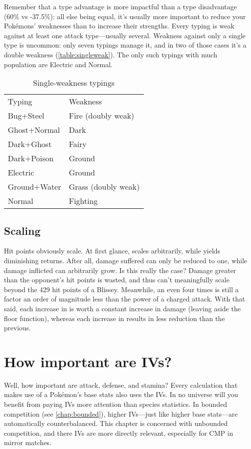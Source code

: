 Remember that a type advantage is more impactful than a type
  disadvantage (60\% vs -37.5\%):
  all else being equal, it's usually more important to reduce your Pokémons'
  weaknesses than to increase their strengths.
Every typing is weak against at least one attack type---usually several.
Weakness against only a single type is uncommon: only seven typings manage it, and in two
 of those cases it's a double weakness (\autoref{table:singleweak}).
The only such typings with much population are Electric and Normal. 
\begin{table}[ht]
\centering
\begin{tabular}{ll}
Typing & Weakness\\
\Midrule
Bug+Steel & Fire (doubly weak) \\
Ghost+Normal & Dark \\
Dark+Ghost & Fairy \\
Dark+Poison & Ground \\
Electric & Ground \\
Ground+Water & Grass (doubly weak) \\
Normal & Fighting \\
\end{tabular}
  \caption{Single-weakness typings\label{table:singleweak}}
\end{table}

\subsection{Scaling\label{subsec:scaling}}
Hit points obviously scale.
At first glance,  scales arbitrarily, while  yields diminishing returns.
After all, damage suffered can only be reduced to one, while damage inflicted
 can arbitrarily grow.
Is this really the case?
Damage greater than the opponent's hit points is wasted, and thus can't meaningfully scale
 beyond the 429 hit points of a  Blissey.
Meanwhile, an  even four times  is still a factor an order of magnitude
 less than the power of a charged attack.
With that said, each increase in  is worth a constant increase in
 damage (leaving aside the floor function), whereas each increase in 
 results in less reduction than the previous.

\section{How important are IVs?}
Well, how important are attack, defense, and stamina?
Every calculation that makes use of a Pokémon's base stats also uses the IVs.
In no universe will you benefit from paying IVs more attention than species statistics.
In bounded competition (see \autoref{chap:bounded}), higher IVs---just like higher
  base stats---are automatically counterbalanced.
This chapter is concerned with unbounded competition, and there IVs are more directly
  relevant, especially for CMP in mirror matches.

